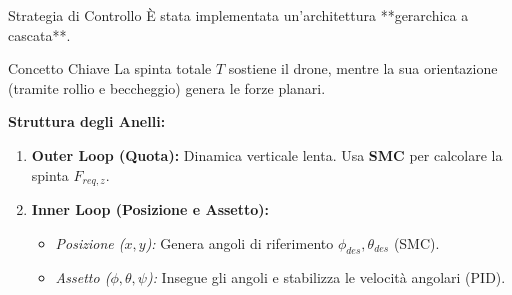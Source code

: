 \documentclass[demo]{beamer} %
\begin{document}
\begin{frame}{Strategia di Controllo}
    È stata implementata un'architettura **gerarchica a cascata**.
    
    \begin{block}{Concetto Chiave}
        La spinta totale $T$ sostiene il drone, mentre la sua orientazione (tramite rollio e beccheggio) genera le forze planari.
    \end{block}

    \vspace{0.5cm}
    \textbf{Struttura degli Anelli:}
    \begin{enumerate}
        \item \textbf{Outer Loop (Quota):} Dinamica verticale lenta. Usa \textbf{SMC} per calcolare la spinta $F_{req,z}$.
        \item \textbf{Inner Loop (Posizione e Assetto):} 
        \begin{itemize}
            \item \textit{Posizione ($x,y$):} Genera angoli di riferimento $\phi_{des}, \theta_{des}$ (SMC).
            \item \textit{Assetto ($\phi, \theta, \psi$):} Insegue gli angoli e stabilizza le velocità angolari (PID).
        \end{itemize}
    \end{enumerate}
\end{frame}
\end{document}
